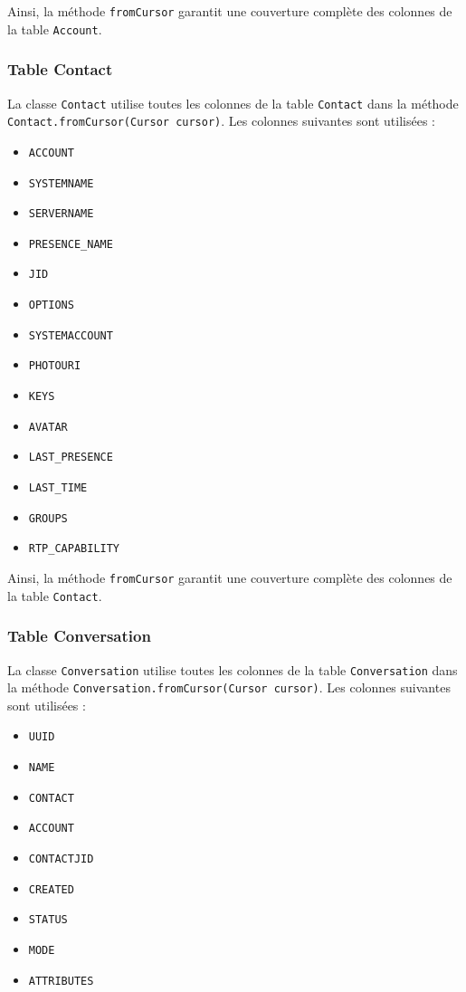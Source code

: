 \documentclass[a4paper,11pt]{article}
\begin{document}
Ainsi, la méthode \texttt{fromCursor} garantit une couverture complète des colonnes de la table \texttt{Account}.

\subsubsection*{Table Contact}

La classe \texttt{Contact} utilise toutes les colonnes de la table \texttt{Contact} dans la méthode \texttt{Contact.fromCursor(Cursor cursor)}. Les colonnes suivantes sont utilisées :

\begin{itemize}
    \item \texttt{ACCOUNT}
    \item \texttt{SYSTEMNAME}
    \item \texttt{SERVERNAME}
    \item \texttt{PRESENCE\_NAME}
    \item \texttt{JID}
    \item \texttt{OPTIONS}
    \item \texttt{SYSTEMACCOUNT}
    \item \texttt{PHOTOURI}
    \item \texttt{KEYS}
    \item \texttt{AVATAR}
    \item \texttt{LAST\_PRESENCE}
    \item \texttt{LAST\_TIME}
    \item \texttt{GROUPS}
    \item \texttt{RTP\_CAPABILITY}
\end{itemize}

Ainsi, la méthode \texttt{fromCursor} garantit une couverture complète des colonnes de la table \texttt{Contact}.

\subsubsection*{Table Conversation}

La classe \texttt{Conversation} utilise toutes les colonnes de la table \texttt{Conversation} dans la méthode \texttt{Conversation.fromCursor(Cursor cursor)}. Les colonnes suivantes sont utilisées :

\begin{itemize}
    \item \texttt{UUID}
    \item \texttt{NAME}
    \item \texttt{CONTACT}
    \item \texttt{ACCOUNT}
    \item \texttt{CONTACTJID}
    \item \texttt{CREATED}
    \item \texttt{STATUS}
    \item \texttt{MODE}
    \item \texttt{ATTRIBUTES}
\end{itemize}
\end{document}
